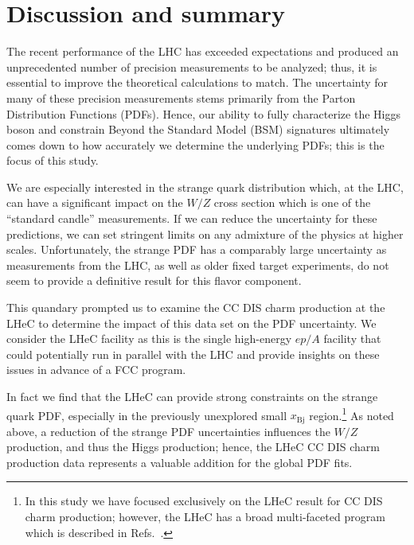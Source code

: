 \documentclass[pdftex,twocolumn,epjc3]{svjour3}          %
\newcommand{\xbj}{\ensuremath{x_{\text{Bj}}}\xspace}
\begin{document}
\section{Discussion and summary}
\label{sec:discuss}





The recent performance of the LHC has exceeded expectations and
produced an unprecedented number of precision measurements to be
analyzed; thus,  it is essential to improve the theoretical calculations to
match.
%
The uncertainty for many of these precision measurements stems
primarily from the Parton Distribution Functions (PDFs).
%
Hence, our ability to fully characterize the Higgs boson and constrain
Beyond the Standard Model (BSM) signatures ultimately comes down to
how accurately we determine the underlying PDFs; this is the focus of
this study.



We are especially interested in the strange quark distribution which,
at the LHC, can have a significant impact on the $W/Z$ cross section
which is one of the ``standard candle'' measurements.
%
If we can reduce the uncertainty for these predictions, we can set
stringent limits on any admixture of the physics at higher scales.
%
Unfortunately, the strange PDF has a comparably large uncertainty as
measurements from the LHC, as well as older fixed target experiments,
do not seem to provide a definitive result for this flavor component.

This quandary prompted us to examine the CC DIS charm production at the LHeC
to determine the impact of this data set on the PDF uncertainty.
%
We consider the LHeC facility as this is the single high-energy $ep/A$ facility that could potentially run
in parallel with the LHC and provide insights on these issues in advance of a FCC program. 

In fact we find that the LHeC can provide strong constraints on the strange quark PDF,
especially in the previously unexplored small \xbj region.\footnote{%
  In this study we have focused exclusively on the LHeC result for CC DIS charm production;
  however, the LHeC has a broad multi-faceted program which is described in Refs.~\cite{AbelleiraFernandez:2012ty,Klein:2018rhq}.
  }
%
As noted above, a reduction of the strange PDF uncertainties influences
the $W/Z$ production, and thus the Higgs production; hence, the
LHeC CC DIS charm production data  represents a valuable addition for the  global PDF fits.
%
\end{document}
